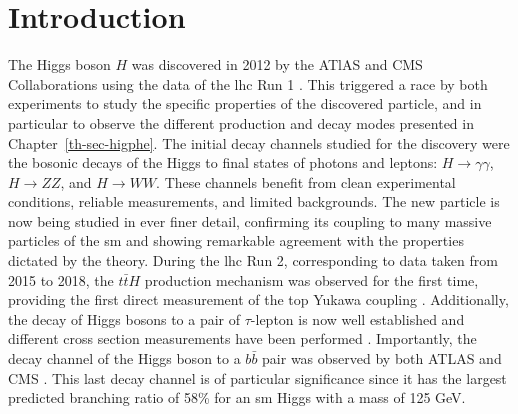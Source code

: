 \section{Introduction}
The Higgs boson $H$ \cite{Englert:1964et, PhysRevLett.13.508, Higgs:1964ia, PhysRevLett.13.585} was discovered in 2012 by the ATlAS and CMS Collaborations using the data of the \gls{lhc} Run 1 \cite{ATLAS:2012yve, CMS:2012qbp}. This triggered a race by both experiments to study the specific properties of the discovered particle, and in particular to observe the different production and decay modes presented in Chapter~\ref{th-sec-higphe}. The initial decay channels studied for the discovery were the bosonic decays of the Higgs to final states of photons and leptons: $H \rightarrow \gamma\gamma$, $H \rightarrow ZZ$, and $H \rightarrow WW$. These channels benefit from clean experimental conditions, reliable measurements, and limited backgrounds. The new particle is now being studied in ever finer detail, confirming its coupling to many massive particles of the \gls{sm} and showing remarkable agreement with the properties dictated by the theory. During the \gls{lhc} Run 2, corresponding to data taken from 2015 to 2018, the $t\bar{t}H$ production mechanism was observed for the first time, providing the first direct measurement of the top Yukawa coupling \cite{ATLAS:2018mme, CMS:2018uxb}. Additionally, the decay of Higgs bosons to a pair of $\tau$-lepton is now well established and different cross section measurements have been performed \cite{atlasTauMeasu, CMS:2021gxc}. Importantly, the decay channel of the Higgs boson to a $b\bar{b}$ pair was observed by both ATLAS and CMS \cite{ATLAS:2018kot, CMS:2018nsn}. This last decay channel is of particular significance since it has the largest predicted branching ratio of 58\% for an \gls{sm} Higgs with a mass of 125 GeV. \\ 


